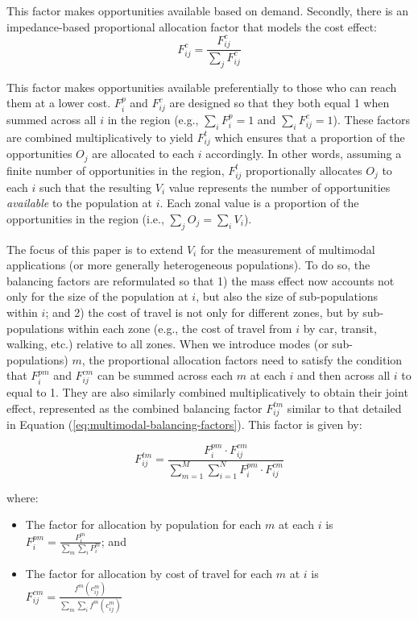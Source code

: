 \documentclass[10pt,letterpaper]{article}
\providecommand{\tightlist}{%
  \setlength{\itemsep}{0pt}\setlength{\parskip}{0pt}}
\begin{document}
This factor makes opportunities available based on demand. Secondly,
there is an impedance-based proportional allocation factor that models
the cost effect: \[
F^c_{ij} = \frac{F^c_{ij}}{\sum_j F^c_{ij}}
\]

This factor makes opportunities available preferentially to those who
can reach them at a lower cost. \(F^p_{i}\) and \(F^c_{ij}\) are
designed so that they both equal 1 when summed across all \(i\) in the
region (e.g., \(\sum_i F^p_{i} = 1\) and \(\sum_i F^c_{ij} = 1\)). These
factors are combined multiplicatively to yield \(F^t_{ij}\) which
ensures that a proportion of the opportunities \(O_j\) are allocated to
each \(i\) accordingly. In other words, assuming a finite number of
opportunities in the region, \(F^t_{ij}\) proportionally allocates
\(O_j\) to each \(i\) such that the resulting \(V_i\) value represents
the number of opportunities \emph{available} to the population at \(i\).
Each zonal value is a proportion of the opportunities in the region
(i.e., \(\sum_j O_j = \sum_i V_i\)).

The focus of this paper is to extend \(V_i\) for the measurement of
multimodal applications (or more generally heterogeneous populations).
To do so, the balancing factors are reformulated so that 1) the mass
effect now accounts not only for the size of the population at \(i\),
but also the size of sub-populations within \(i\); and 2) the cost of
travel is not only for different zones, but by sub-populations within
each zone (e.g., the cost of travel from \(i\) by car, transit, walking,
etc.) relative to all zones. When we introduce modes (or
sub-populations) \(m\), the proportional allocation factors need to
satisfy the condition that \(F^{pm}_{i}\) and \(F^{cm}_{ij}\) can be
summed across each \(m\) at each \(i\) and then across all \(i\) to
equal to 1. They are also similarly combined multiplicatively to obtain
their joint effect, represented as the combined balancing factor
\(F^{tm}_{ij}\) similar to that detailed in Equation
(\ref{eq:multimodal-balancing-factors}). This factor is given by:

\begin{equation}
\label{eq:multimodal-balancing-factors}
F^{tm}_{ij} = \frac{F^{pm}_{i} \cdot F^{cm}_{ij}}{\sum_{m=1}^M \sum_{i=1}^N F^{pm}_{i} \cdot F^{cm}_{ij}}
\end{equation}

\noindent where:

\begin{itemize}
\tightlist
\item
  The factor for allocation by population for each \(m\) at each \(i\)
  is \(F^{pm}_{i} = \frac{P_{i}^m}{\sum_{m}\sum_{i} P_{i}^m}\); and
\item
  The factor for allocation by cost of travel for each \(m\) at \(i\) is
  \(F_{ij}^{cm} = \frac{f^m(c_{ij}^m)}{\sum_{m} \sum_{i} f^m(c_{ij}^m)}\)
\end{itemize}
\end{document}
